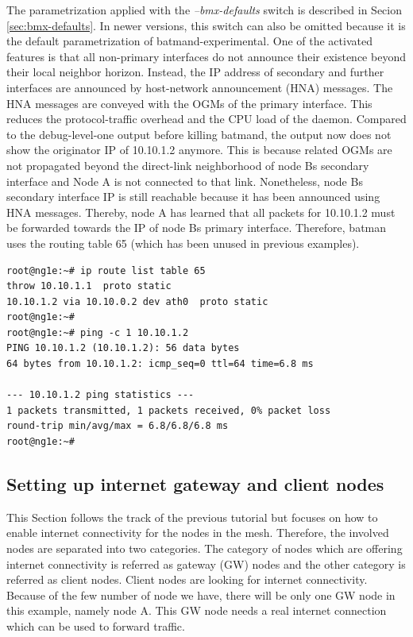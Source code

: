 \documentclass[11pt]{article}
\begin{document}
\begin{enumerate}
The parametrization applied with the \emph{--bmx-defaults} switch is described in Secion \ref{sec:bmx-defaults}. In newer versions, this switch can also be omitted because it is the default parametrization of batmand-experimental.
One of the activated features is that all non-primary interfaces do not announce their existence beyond their local neighbor horizon.
Instead, the IP address of secondary and further interfaces are announced by host-network announcement (HNA) messages.
The HNA messages are conveyed with the OGMs of the primary interface.
This reduces the protocol-traffic overhead and the CPU load of the daemon.
%
Compared to the debug-level-one output before killing batmand, the output now does not show the originator IP of 10.10.1.2 anymore. This is because related OGMs are not propagated beyond the direct-link neighborhood of node Bs secondary interface and Node A is not connected to that link. Nonetheless, node Bs secondary interface IP is still reachable because it has been announced using HNA messages. Thereby, node A has learned that all packets for 10.10.1.2 must be forwarded towards the IP of node Bs primary interface.
%
Therefore, batman uses the routing table 65 (which has been unused in previous examples).

\begin{small} \begin{verbatim}
root@ng1e:~# ip route list table 65
throw 10.10.1.1  proto static
10.10.1.2 via 10.10.0.2 dev ath0  proto static
root@ng1e:~#
root@ng1e:~# ping -c 1 10.10.1.2
PING 10.10.1.2 (10.10.1.2): 56 data bytes
64 bytes from 10.10.1.2: icmp_seq=0 ttl=64 time=6.8 ms

--- 10.10.1.2 ping statistics ---
1 packets transmitted, 1 packets received, 0% packet loss
round-trip min/avg/max = 6.8/6.8/6.8 ms
root@ng1e:~#
\end{verbatim} \end{small}


\end{enumerate}


\subsection{Setting up internet gateway and client nodes}
\label{sec:howto-gw}

This Section follows the track of the previous tutorial but focuses on how to enable internet connectivity for the nodes in the mesh.
Therefore, the involved nodes are separated into two categories.
The category of nodes which are offering internet connectivity is referred as gateway (GW) nodes and the other category is referred as client nodes.
Client nodes are looking for internet connectivity.
Because of the few number of node we have, there will be only one GW node in this example, namely node A.
This GW node needs a real internet connection which can be used to forward traffic.
\end{document}
